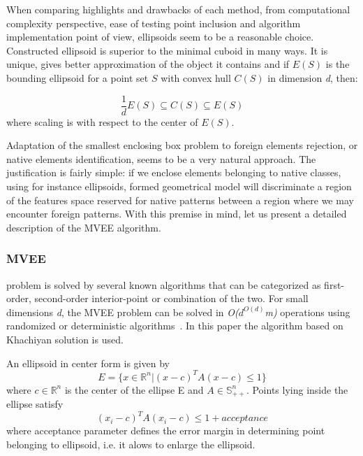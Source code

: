 \documentclass{llncs}
\begin{document}
When comparing highlights and drawbacks of each method, from computational complexity perspective, ease of testing point inclusion and algorithm implementation point of view, ellipsoids seem to be a reasonable choice. Constructed ellipsoid is superior to the minimal cuboid in many ways. It is unique, gives better approximation of the object it contains and if $E(S)$ is the bounding ellipsoid for a point set $S$ with convex hull $C(S)$ in dimension \textit{d}, then:

\[ 
  \frac{1}{d}E(S) \subseteq C(S) \subseteq E(S) 
\]
where scaling is with respect to the center of $E(S)$.

Adaptation of the smallest enclosing box problem to foreign elements rejection, or native elements identification, seems to be a very natural approach. The justification is fairly simple: if we enclose elements belonging to native classes, using for instance ellipsoids, formed geometrical model will discriminate a region of the features space reserved for native patterns between a region where we may encounter foreign patterns. With this premise in mind, let us present a detailed description of the MVEE algorithm.

\vspace{-9pt}
\subsubsection{MVEE}


problem is solved by several known algorithms that can be categorized as first-order, second-order interior-point or combination of the two. For small dimensions \textit{d}, the MVEE problem can be solved in \textit{O($d^{O(d)}$m)} operations using randomized or deterministic algorithms~\cite{MVEEMichaelTodd2005}. In this paper the algorithm based on Khachiyan solution is used.

\noindent An ellipsoid in center form is given by 
\[ 
  E = \{x \in \mathbb{R}^{n} | (x - c)^{T}A(x-c) \le 1\} 
\] 
where $c \in \mathbb{R}^{n}$ is the center of the ellipse E and $ A \in \mathbb{S}^{n}_{++}$. Points lying inside the ellipse satisfy 
\[ 
  (x_{i} - c)^{T}A(x_{i} - c) \le 1 + acceptance 
\] 
where acceptance parameter defines the error margin in determining point belonging to ellipsoid, i.e. it alows to enlarge the ellipsoid.%
\end{document}
